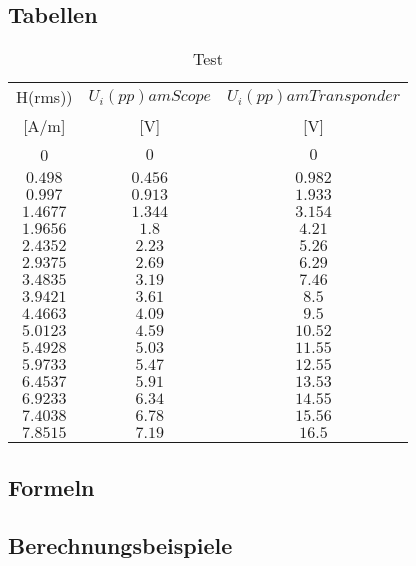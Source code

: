 \documentclass[12pt,a4paper,ngerman]{article}
\begin{document}
\subsection{Tabellen}
\begin{table}
\begin{center}
\begin{tabular}{ |c|c|c| }
  \hline

    H(rms)) & $U_i(pp) am Scope$ & $U_i(pp) am Transponder$\\

	{[A/m]} & {[V]} & {[V]} \\
  \hline
  0 & $0$ & $0$\\
  \hline
  $0.498$ & $0.456$ & $0.982$ \\
  \hline
  $0.997$ & $0.913$ & $1.933$\\
  \hline
  $1.4677$ & $1.344$ & $3.154$\\
    \hline
  $1.9656$ & $1.8$ & $4.21$\\
    \hline
  $2.4352$ & $2.23$ & $5.26$ \\
    \hline
  $2.9375$ & $2.69$ & $6.29$\\
     \hline
  $3.4835$ & $3.19$ & $7.46$ \\ 
    \hline
  $3.9421$ & $3.61$ & $8.5$  \\
    \hline
  $4.4663$ & $4.09$ & $9.5$  \\
    \hline
  $5.0123$ & $4.59$ & $10.52$  \\
    \hline
  $5.4928$ & $5.03$ & $11.55$  \\
    \hline
  $5.9733$ & $5.47$ & $12.55$ \\
     \hline
  $6.4537$ & $5.91$ & $13.53$ \\
      \hline
  $6.9233$ & $6.34$ & $14.55$ \\ 
      \hline
  $7.4038$ & $6.78$ & $15.56$  \\
      \hline
  $7.8515$ & $7.19$ & $16.5$  \\
      \hline 
\end{tabular}
\caption{Test}
\end{center}
\end{table} 
\subsection{Formeln}

\subsection{Berechnungsbeispiele}
\end{document}
